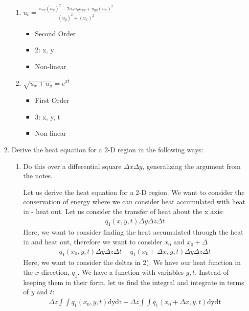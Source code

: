 \documentclass{article}
\begin{document}
\begin{enumerate}
\begin{enumerate}
    \item $u_t = \frac{u_{xx} (u_y)^2 - 2 u_x u_y u_{xy} + u_{yy} (u_x)^2}{(u_y)^2 + (u_x)^2} $
    \begin{itemize}
      \item Second Order
      \item 2: x, y
      \item Non-linear
    \end{itemize}
    \item $\sqrt{u_x + u_y} = e^{xt}$
    \begin{itemize}
      \item First Order
      \item 3: x, y, t
      \item Non-linear
    \end{itemize}
  \end{enumerate}
  \newpage
  \item Derive the heat equation for a 2-D region in the following ways:
  \begin{enumerate}
    \item Do this over a differential square $\Delta x \Delta y$, generalizing the argument from the notes.

    Let us derive the heat equation for a 2-D region. We want to consider the conservation of energy where we can consider heat accumulated with heat in - heat out. Let us consider the transfer of heat about the x axis:
    \begin{align}
      q_{1}(x, y, t) \Delta y \Delta z \Delta t
    \end{align}
    Here, we want to consider finding the heat accumulated through the heat in and heat out, therefore we want to consider $x_0$ and $x_0 + \Delta$
    \begin{align}
      q_1(x_0, y, t) \Delta y \Delta z \Delta t - q_1(x_0 + \Delta x, y, t) \Delta y \Delta z \Delta t
    \end{align}
    Here, we want to consider the deltas in 2). We have our heat function in the $x$ direction, $q_1$. We have a function with variables $y, t$. Instead of keeping them in their form, let us find the integral and integrate in terms of $y$ and $t$:
    \begin{align}
      \Delta z \int \int q_1(x_0, y, t) \text{dy} \text{dt} - \Delta z \int \int q_1(x_0 + \Delta x, y, t) \text{dy} \text{dt}
    \end{align}


\end{enumerate}
\end{enumerate}
\end{document}
